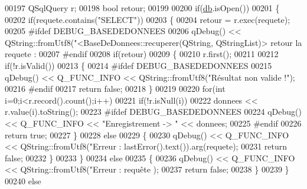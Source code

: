 \begin{DoxyCode}
{{{{{{{00197     QSqlQuery r;
00198     \textcolor{keywordtype}{bool} retour;
00199 
00200     \textcolor{keywordflow}{if}(\hyperlink{class_base_de_donnees_a3e738dcf443370c46a541677ab619f06}{db}.isOpen())
00201     \{
00202         \textcolor{keywordflow}{if}(requete.contains(\textcolor{stringliteral}{"SELECT"}))
00203         \{
00204             retour = r.exec(requete);
00205 \textcolor{preprocessor}{            #ifdef DEBUG\_BASEDEDONNEES}
00206             qDebug() << QString::fromUtf8(\textcolor{stringliteral}{"<BaseDeDonnees::recuperer(QString, QStringList)> retour %
       la requete : %
00207 \textcolor{preprocessor}{            #endif}
00208             \textcolor{keywordflow}{if}(retour)
00209             \{
00210                 r.first();
00211 
00212                 \textcolor{keywordflow}{if}(!r.isValid())
00213                 \{
00214 \textcolor{preprocessor}{                    #ifdef DEBUG\_BASEDEDONNEES}
00215                     qDebug() << Q\_FUNC\_INFO << QString::fromUtf8(\textcolor{stringliteral}{"Résultat non valide !"});
00216 \textcolor{preprocessor}{                    #endif}
00217                     \textcolor{keywordflow}{return} \textcolor{keyword}{false};
00218                 \}
00219 
00220                 \textcolor{keywordflow}{for}(\textcolor{keywordtype}{int} i=0;i<r.record().count();i++)
00221                     \textcolor{keywordflow}{if}(!r.isNull(i))
00222                         donnees << r.value(i).toString();
00223 \textcolor{preprocessor}{                #ifdef DEBUG\_BASEDEDONNEES}
00224                 qDebug() << Q\_FUNC\_INFO << \textcolor{stringliteral}{"Enregistrement -> "} << donnees;
00225 \textcolor{preprocessor}{                #endif}
00226                 \textcolor{keywordflow}{return} \textcolor{keyword}{true};
00227             \}
00228             \textcolor{keywordflow}{else}
00229             \{
00230                 qDebug() << Q\_FUNC\_INFO << QString::fromUtf8(\textcolor{stringliteral}{"Erreur : %
      lastError().text()).arg(requete);
00231                 \textcolor{keywordflow}{return} \textcolor{keyword}{false};
00232             \}
00233         \}
00234         \textcolor{keywordflow}{else}
00235         \{
00236             qDebug() << Q\_FUNC\_INFO << QString::fromUtf8(\textcolor{stringliteral}{"Erreur : requête %
      );
00237             \textcolor{keywordflow}{return} \textcolor{keyword}{false};
00238         \}
00239     \}
00240     \textcolor{keywordflow}{else}
}}}}}}}}}}
\end{DoxyCode}
